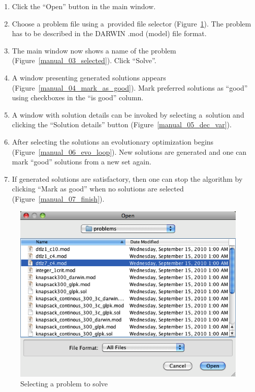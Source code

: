 \begin{enumerate}
\item Click the ``Open'' button in the main window.
\item Choose a problem file using a~provided file selector
  (Figure~\ref{manual_02_problem_selector}). The problem has to be described in
  the DARWIN .mod (model) file format.
\item The main window now shows a name of the problem
  (Figure~\ref{manual_03_selected}). Click ``Solve''.
\item A window presenting generated solutions appears
  (Figure~\ref{manual_04_mark_as_good}). Mark preferred solutions as ``good''
  using checkboxes in the ``is good'' column.
\item A window with solution details can be invoked by selecting a~solution
  and clicking the ``Solution details'' button (Figure~\ref{manual_05_dec_var}).
\item After selecting the solutions an evolutionary optimization begins
  (Figure~\ref{manual_06_evo_loop}). New solutions are generated and one can
  mark ``good'' solutions from a new set again.
\item If generated solutions are satisfactory, then one can stop the
  algorithm by clicking ``Mark as good'' when no solutions are selected
  (Figure~\ref{manual_07_finish}).
\end{enumerate}

\begin{figure}[htb]
  \centering
  \includegraphics[scale=0.7]{img/manual/02_problem_selector}
  \caption{Selecting a problem to solve}
  \label{manual_02_problem_selector}
\end{figure}

